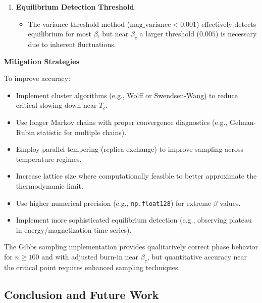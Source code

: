 \documentclass[11pt]{article}
\providecommand{\tightlist}{%
      \setlength{\itemsep}{0pt}\setlength{\parskip}{0pt}}
\begin{document}
\begin{enumerate}
  \begin{itemize}
  \tightlist
  \item
    The quality of randomness affects the Gibbs updates. Poor generators
    may lead to correlated updates and biased sampling.
  \end{itemize}
\item
  \textbf{Equilibrium Detection Threshold}:

  \begin{itemize}
  \tightlist
  \item
    The variance threshold method (\(\text{mag\_variance}<0.001\))
    effectively detects equilibrium for most \(\beta\), but near
    \(\beta_c\) a larger threshold (\(0.005\)) is necessary due to
    inherent fluctuations.
  \end{itemize}
\end{enumerate}

\textbf{Mitigation Strategies}

To improve accuracy:

\begin{itemize}
\tightlist
\item
  Implement cluster algorithms (e.g., Wolff or Swendsen-Wang) to reduce
  critical slowing down near \(T_c\).
\item
  Use longer Markov chains with proper convergence diagnostics (e.g.,
  Gelman-Rubin statistic for multiple chains).
\item
  Employ parallel tempering (replica exchange) to improve sampling
  across temperature regimes.
\item
  Increase lattice size where computationally feasible to better
  approximate the thermodynamic limit.
\item
  Use higher numerical precision (e.g., \texttt{np.float128}) for
  extreme \(\beta\) values.
\item
  Implement more sophisticated equilibrium detection (e.g., observing
  plateau in energy/magnetization time series).
\end{itemize}

The Gibbs sampling implementation provides qualitatively correct phase
behavior for \(n\geq100\) and with adjusted burn-in near \(\beta_c\),
but quantitative accuracy near the critical point requires enhanced
sampling techniques.

    \subsection{Conclusion and Future
Work}\label{conclusion-and-future-work}
\end{document}
